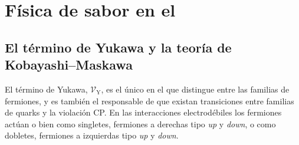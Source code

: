 \color{norm}




\section{Física de sabor en el \stdmod} %

\subsection{El término de Yukawa y la teoría de Kobayashi--Maskawa} %





El término de Yukawa, $\mathcal{V}_{\text{Y}}$, es el único en el \stdmod que distingue entre las familias de fermiones, y es también el responsable de que existan transiciones entre familias de quarks y la violación CP.
En las interacciones electrodébiles los fermiones actúan o bien como singletes, fermiones a derechas tipo \emph{up} y \emph{down}, o como dobletes, fermiones a izquierdas tipo \emph{up} y \emph{down}.

